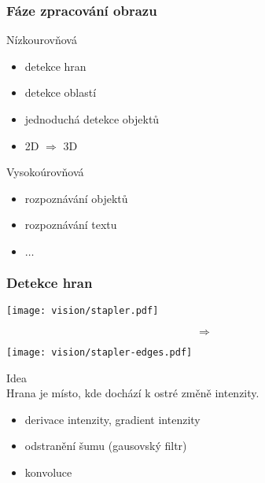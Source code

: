 \documentclass[red,handout,professionalfont]{beamer}
\theoremstyle{definition}
\newcommand{\0}{\mbox{${\bf 0}$}}
\begin{document}
\begin{frame}\frametitle{Fáze zpracování obrazu}
\begin{center}
\alert{Nízkourovňová}\pause
\end{center}
\begin{itemize}
 \item detekce hran\pause
 \item detekce oblastí\pause
 \item jednoduchá detekce objektů\pause
 \item 2D $\Rightarrow$ 3D\pause
\end{itemize}
\begin{center}
\alert{Vysokoúrovňová}\pause
\end{center}
\begin{itemize}
 \item rozpoznávání objektů\pause
 \item rozpoznávání textu\pause
 \item $\ldots$
\end{itemize}
\end{frame}

\begin{frame}\frametitle{Detekce hran}
\pause
\begin{center}
\begin{minipage}{4cm}
\texttt{[image: vision/stapler.pdf]}
\end{minipage}\pause
\begin{minipage}{1cm}
\begin{displaymath}
 \Rightarrow
\end{displaymath}
\end{minipage}\pause
\begin{minipage}{4cm}
\texttt{[image: vision/stapler-edges.pdf]}
\end{minipage}
\end{center}\pause
\begin{block}{}
\begin{center}
 Idea\pause\\
 Hrana je místo, kde dochází k ostré změně intenzity.
 \end{center}
\end{block}\pause
\begin{itemize}
 \item derivace intenzity, gradient intenzity \pause
 \item odstranění šumu (gausovský filtr)\pause
 \item konvoluce\pause
\end{itemize}
\end{frame}
\end{document}
